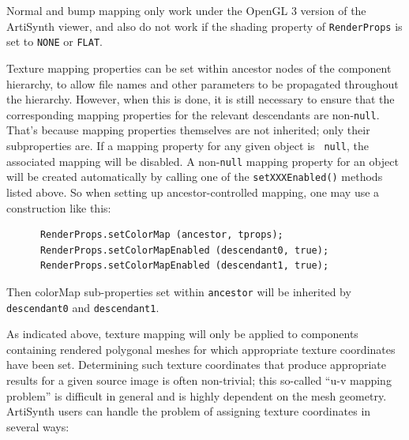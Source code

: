 \begin{sideblock}
Normal and bump mapping only work under the OpenGL 3 version of the
ArtiSynth viewer, and also do not work if the {\sf shading} property
of {\tt RenderProps} is set to {\tt NONE} or {\tt FLAT}.
\end{sideblock}

\begin{sideblock}
Texture mapping properties can be set within ancestor nodes of the
component hierarchy, to allow file names and other parameters to be
propagated throughout the hierarchy. However, when this is done, it is
still necessary to ensure that the corresponding mapping
properties for the relevant descendants are non-{\tt null}.  That's
because mapping properties themselves are not inherited; only their
subproperties are. If a mapping property for any given object is {\tt
null}, the associated mapping will be disabled. A non-{\tt null}
mapping property for an object will be created automatically by
calling one of the {\tt setXXXEnabled()} methods listed above.  So 
when setting up ancestor-controlled mapping, one may use a
construction like this:
%
\begin{verbatim}
      RenderProps.setColorMap (ancestor, tprops);
      RenderProps.setColorMapEnabled (descendant0, true);
      RenderProps.setColorMapEnabled (descendant1, true);
\end{verbatim}
%
Then {\sf colorMap} sub-properties set within {\tt ancestor} will
be inherited by {\tt descendant0} and {\tt descendant1}.
\end{sideblock}

As indicated above, texture mapping will only be applied to components
containing rendered polygonal meshes for which appropriate texture
coordinates have been set. Determining such texture coordinates that
produce appropriate results for a given source image is often
non-trivial; this so-called ``u-v mapping problem'' is difficult in
general and is highly dependent on the mesh geometry. ArtiSynth users
can handle the problem of assigning texture coordinates in several
ways:

